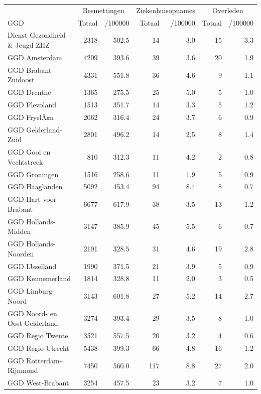 \documentclass[
  english,
  man,floatsintext]{apa6}
\begin{document}
\begin{table}
\centering\begingroup\fontsize{10}{12}\selectfont

\begin{threeparttable}
\begin{tabular}{lrrrrrr}
\toprule
\multicolumn{1}{c}{ } & \multicolumn{2}{c}{Besmettingen} & \multicolumn{2}{c}{Ziekenhuisopnames} & \multicolumn{2}{c}{Overleden} \\
\cmidrule(l{3pt}r{3pt}){2-3} \cmidrule(l{3pt}r{3pt}){4-5} \cmidrule(l{3pt}r{3pt}){6-7}
GGD & Totaal & /100000 & Totaal & /100000 & Totaal & /100000\\
\midrule
Dienst Gezondheid \& Jeugd ZHZ & 2318 & 502.5 & 14 & 3.0 & 15 & 3.3\\
GGD Amsterdam & 4209 & 393.6 & 39 & 3.6 & 20 & 1.9\\
GGD Brabant-Zuidoost & 4331 & 551.8 & 36 & 4.6 & 9 & 1.1\\
GGD Drenthe & 1365 & 275.5 & 25 & 5.0 & 5 & 1.0\\
GGD Flevoland & 1513 & 351.7 & 14 & 3.3 & 5 & 1.2\\
GGD FryslÃ¢n & 2062 & 316.4 & 24 & 3.7 & 6 & 0.9\\
GGD Gelderland-Zuid & 2801 & 496.2 & 14 & 2.5 & 8 & 1.4\\
GGD Gooi en Vechtstreek & 810 & 312.3 & 11 & 4.2 & 2 & 0.8\\
GGD Groningen & 1516 & 258.6 & 11 & 1.9 & 5 & 0.9\\
GGD Haaglanden & 5092 & 453.4 & 94 & 8.4 & 8 & 0.7\\
GGD Hart voor Brabant & 6677 & 617.9 & 38 & 3.5 & 13 & 1.2\\
GGD Hollands-Midden & 3147 & 385.9 & 45 & 5.5 & 6 & 0.7\\
GGD Hollands-Noorden & 2191 & 328.5 & 31 & 4.6 & 19 & 2.8\\
GGD IJsselland & 1990 & 371.5 & 21 & 3.9 & 5 & 0.9\\
GGD Kennemerland & 1814 & 328.8 & 11 & 2.0 & 3 & 0.5\\
GGD Limburg-Noord & 3143 & 601.8 & 27 & 5.2 & 14 & 2.7\\
GGD Noord- en Oost-Gelderland & 3274 & 393.4 & 29 & 3.5 & 8 & 1.0\\
GGD Regio Twente & 3521 & 557.5 & 20 & 3.2 & 4 & 0.6\\
GGD Regio Utrecht & 5438 & 399.3 & 66 & 4.8 & 16 & 1.2\\
GGD Rotterdam-Rijnmond & 7450 & 560.0 & 117 & 8.8 & 27 & 2.0\\
GGD West-Brabant & 3254 & 457.5 & 23 & 3.2 & 7 & 1.0\\

\end{tabular}
\end{threeparttable}
\end{table}
\end{document}
